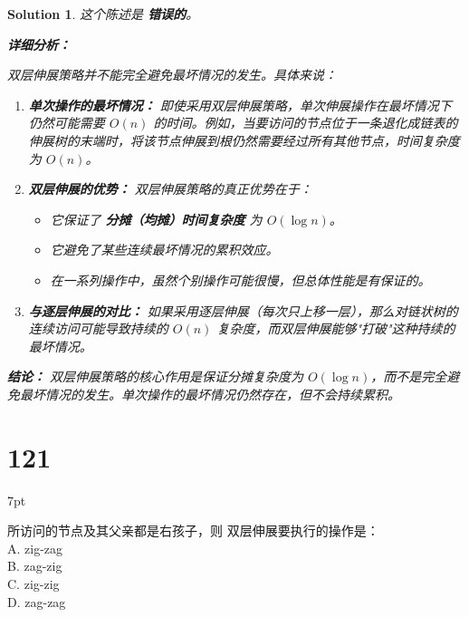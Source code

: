 \documentclass[UTF8]{report}
\newtheorem{solution}{Solution}
\theoremstyle{MyLineTheoremStyle} %
\theoremstyle{MyBlockTheoremStyle} %
\theoremstyle{MySubsubsectionStyle} %
\newenvironment{graybox}{%
        \def\FrameCommand{%
        \hspace{1pt}%
        {\color{gray}\small \vrule width 2pt}%
        {\color{graybox_color}\vrule width 4pt}%
        \colorbox{graybox_color}%
        }%
        \MakeFramed{\advance\hsize-\width\FrameRestore}%
        \noindent\hspace{-4.55pt}%
        \begin{adjustwidth}{}{7pt}%
        \vspace{2pt}\vspace{2pt}%
        }
        {%
        \vspace{2pt}\end{adjustwidth}\endMakeFramed%
        }
\begin{document}
\begin{solution}
这个陈述是 \textbf{错误的}。

\textbf{详细分析：}

双层伸展策略并不能完全避免最坏情况的发生。具体来说：

\begin{enumerate}
    \item \textbf{单次操作的最坏情况：}
    即使采用双层伸展策略，单次伸展操作在最坏情况下仍然可能需要 $O(n)$ 的时间。例如，当要访问的节点位于一条退化成链表的伸展树的末端时，将该节点伸展到根仍然需要经过所有其他节点，时间复杂度为 $O(n)$。

    \item \textbf{双层伸展的优势：}
    双层伸展策略的真正优势在于：
    \begin{itemize}
        \item 它保证了 \textbf{分摊（均摊）时间复杂度} 为 $O(\log n)$。
        \item 它避免了某些连续最坏情况的累积效应。
        \item 在一系列操作中，虽然个别操作可能很慢，但总体性能是有保证的。
    \end{itemize}

    \item \textbf{与逐层伸展的对比：}
    如果采用逐层伸展（每次只上移一层），那么对链状树的连续访问可能导致持续的 $O(n)$ 复杂度，而双层伸展能够"打破"这种持续的最坏情况。
\end{enumerate}

\textbf{结论：}
双层伸展策略的核心作用是保证分摊复杂度为 $O(\log n)$，而不是完全避免最坏情况的发生。单次操作的最坏情况仍然存在，但不会持续累积。
\end{solution}



\section*{121}
\begin{graybox}
所访问的节点及其父亲都是右孩子，则
双层伸展要执行的操作是：\\
A. zig-zag\\
B. zag-zig\\
C. zig-zig\\
D. zag-zag
\end{graybox}
\end{document}
